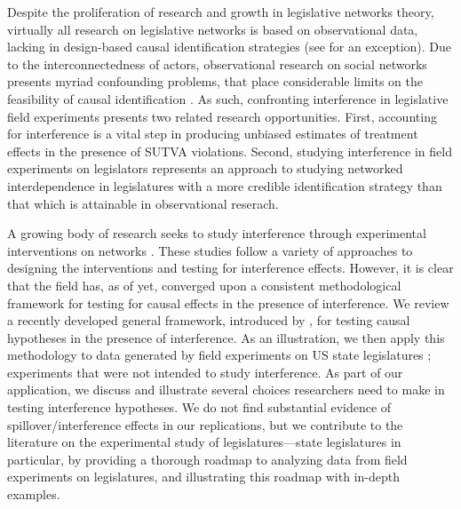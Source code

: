 \documentclass[12pt]{article}
\begin{document}
Despite the proliferation of research and growth in legislative networks theory, virtually all research on legislative networks is based on observational data, lacking in design-based causal identification strategies (see \citet{rogowski2012estimating} for an exception). Due to the interconnectedness of actors, observational research on social networks presents myriad confounding problems, that place considerable limits on the feasibility of causal identification \citep{Shalizi:2011}. As such, confronting interference in legislative field experiments presents two related research opportunities. First, accounting for interference is a vital step in producing unbiased estimates of treatment effects in the presence of SUTVA violations. Second, studying interference in field experiments on legislators represents an approach to studying networked interdependence in legislatures with a more credible identification strategy than that which is attainable in observational reserach. 

A growing body of research seeks to study interference through experimental interventions on networks \citep[e.g., ][]{gerber2008,paluck2011,Bond:2012,muchnik2013,aral2014,bapna2015,Ben-AaronPAR}. These studies follow a variety of approaches to designing the interventions and testing for interference effects. However, it is clear that the field has, as of yet, converged upon a consistent methodological framework for testing for causal effects in the presence of interference.  We review a recently developed general framework, introduced by \citet{bowers2012reasoning}, for testing causal hypotheses in the presence of interference. As an illustration, we then apply this methodology to data generated by field experiments on US state legislatures \citep{butler2011can,bergan2015call,broockman2013black}; experiments that were not intended to study interference. As part of our application, we discuss and illustrate several choices researchers need to make in testing interference hypotheses. We do not find substantial evidence of spillover/interference effects in our replications, but we contribute to the literature on the experimental study of legislatures---state legislatures in particular, by providing a thorough roadmap to analyzing data from field experiments on legislatures, and illustrating this roadmap with in-depth examples.


\end{document}
